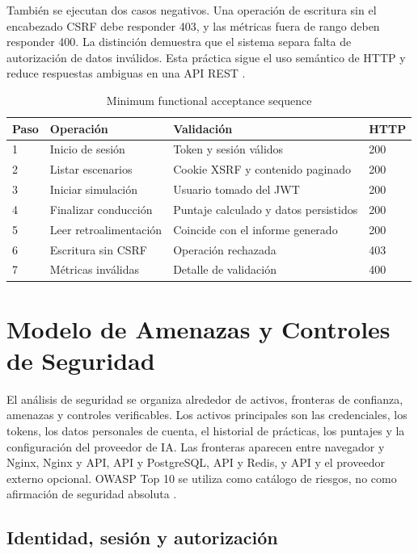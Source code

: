 \documentclass[11pt,a4paper]{report}
\begin{document}
También se ejecutan dos casos negativos. Una operación de escritura sin el
encabezado CSRF debe responder 403, y las métricas fuera de rango deben responder
400. La distinción demuestra que el sistema separa falta de autorización de datos
inválidos. Esta práctica sigue el uso semántico de HTTP y reduce respuestas ambiguas
en una API REST \cite{fielding2000architectural}.

\begin{table}[htbp]
\centering
\caption{Minimum functional acceptance sequence}
\begin{tabularx}{\textwidth}{p{1.1cm}p{4.2cm}X p{1.6cm}}
\toprule
\textbf{Paso} & \textbf{Operación} & \textbf{Validación} & \textbf{HTTP} \\
\midrule
1 & Inicio de sesión & Token y sesión válidos & 200 \\
2 & Listar escenarios & Cookie XSRF y contenido paginado & 200 \\
3 & Iniciar simulación & Usuario tomado del JWT & 200 \\
4 & Finalizar conducción & Puntaje calculado y datos persistidos & 200 \\
5 & Leer retroalimentación & Coincide con el informe generado & 200 \\
6 & Escritura sin CSRF & Operación rechazada & 403 \\
7 & Métricas inválidas & Detalle de validación & 400 \\
\bottomrule
\end{tabularx}
\end{table}

\chapter{Modelo de Amenazas y Controles de Seguridad}
\label{anexo:modelo-amenazas}

El análisis de seguridad se organiza alrededor de activos, fronteras de confianza,
amenazas y controles verificables. Los activos principales son las credenciales, los
tokens, los datos personales de cuenta, el historial de prácticas, los puntajes y la
configuración del proveedor de IA. Las fronteras aparecen entre navegador y Nginx,
Nginx y API, API y PostgreSQL, API y Redis, y API y el proveedor externo opcional.
OWASP Top 10 se utiliza como catálogo de riesgos, no como afirmación de seguridad
absoluta \cite{owasp2021}.

\section{Identidad, sesión y autorización}
\end{document}
